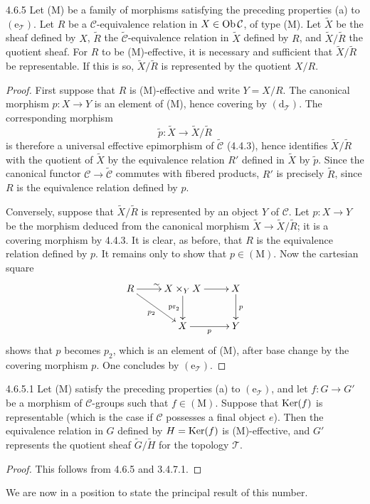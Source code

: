 \begin{lemma}{4.6.5}\label{IV.4.6.5}
Let (M) be a family of morphisms satisfying the preceding
properties (a) to \((\mathrm e_{\mathcal T})\).
Let \(R\) be a \(\mathcal C\)-equivalence relation in
\(X\in\operatorname{Ob}\mathcal C\), of type (M).
Let \(\widetilde X\) be the sheaf defined by \(X\),
\(\widetilde R\) the \(\widetilde{\mathcal C}\)-equivalence
relation in \(\widetilde X\) defined by \(R\), and
\(\widetilde X/\widetilde R\) the quotient sheaf.
For \(R\) to be (M)-effective, it is necessary and sufficient
that \(\widetilde X/\widetilde R\) be representable.
If this is so, \(\widetilde X/\widetilde R\) is represented
by the quotient \(X/R\).
\end{lemma}
\begin{proof}
First suppose that \(R\) is (M)-effective and write \(Y=X/R\).
The canonical morphism \(p:X\to Y\) is an element of (M),
hence covering by \((\mathrm d_{\mathcal T})\).
The corresponding morphism
\[
\widetilde p:\widetilde X\longrightarrow
\widetilde X/\widetilde R
\]
is therefore a universal effective epimorphism of
\(\widetilde{\mathcal C}\) (4.4.3), hence identifies
\(\widetilde X/\widetilde R\) with the quotient of
\(\widetilde X\) by the equivalence relation \(R'\)
defined in \(\widetilde X\) by \(\widetilde p\).
Since the canonical functor \(\mathcal C\to
\widetilde{\mathcal C}\) commutes with fibered products,
\(R'\) is precisely \(\widetilde R\), since \(R\) is the
equivalence relation defined by \(p\).

Conversely, suppose that \(\widetilde X/\widetilde R\)
is represented by an object \(Y\) of \(\mathcal C\).
Let \(p:X\to Y\) be the morphism deduced from the canonical
morphism \(\widetilde X\to\widetilde X/\widetilde R\);
it is a covering morphism by 4.4.3.
It is clear, as before, that \(R\) is the equivalence relation
defined by \(p\). It remains only to show that \(p\in(\mathrm M)\).
Now the cartesian square
\[
\xymatrix{
R\ar[r]^{\sim}\ar[dr]_{p_2}
 & X\times_Y X\ar[r]\ar[d]_{\mathrm{pr}_2} & X\ar[d]^p\\
 & X\ar[r]_p & Y }
\]
shows that \(p\) becomes \(p_2\), which is an element of (M),
after base change by the covering morphism \(p\).
One concludes by \((\mathrm e_{\mathcal T})\).
\end{proof}

\begin{corollary}{4.6.5.1}\label{IV.4.6.5.1}
Let (M) satisfy the preceding properties (a) to
\((\mathrm e_{\mathcal T})\), and let \(f:G\to G'\) be a
morphism of \(\mathcal C\)-groups such that \(f\in(\mathrm M)\).
Suppose that \(\operatorname{Ker}(f)\) is representable (which is the
case if \(\mathcal C\) possesses a final object \(e\)).
Then the equivalence relation in \(G\) defined by \(H=\operatorname{Ker}(f)\)
is (M)-effective, and \(G'\) represents the quotient sheaf
\(\widetilde G/\widetilde H\) for the topology \(\mathcal T\).
\end{corollary}
\begin{proof}
This follows from 4.6.5 and 3.4.7.1.
\end{proof}
We are now in a position to state the principal result of this number.

